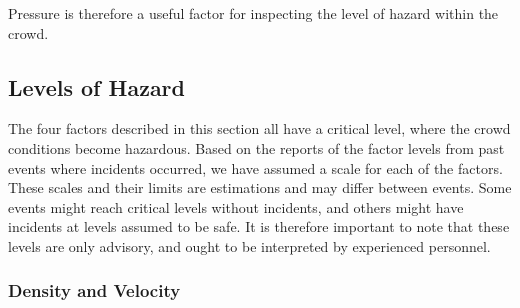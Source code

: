 Pressure is therefore a useful factor for inspecting the level of hazard within the crowd.


\subsection{Levels of Hazard}
\label{subsec:levelsOfHazard}
The four factors described in this section all have a critical level, where the crowd conditions become hazardous. Based on the reports of the factor levels from past events where incidents occurred, we have assumed a scale for each of the factors. These scales and their limits are estimations and may differ between events. Some events might reach critical levels without incidents, and others might have incidents at levels assumed to be safe. It is therefore important to note that these levels are only advisory, and ought to be interpreted by experienced personnel.


\subsubsection{Density and Velocity}

